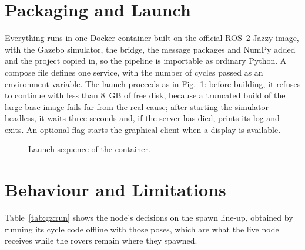 \section{Packaging and Launch}

Everything runs in one Docker container built on the official ROS~2 Jazzy
image, with the Gazebo simulator, the bridge, the message packages and NumPy
added and the project copied in, so the pipeline is importable as ordinary
Python. A compose file defines one service, with the number of cycles passed as
an environment variable. The launch proceeds as in Fig.~\ref{fig:gz:launch}:
before building, it refuses to continue with less than 8~GB of free disk,
because a truncated build of the large base image fails far from the real
cause; after starting the simulator headless, it waits three seconds and, if
the server has died, prints its log and exits. An optional flag starts the
graphical client when a display is available.

\begin{figure}[htbp]
\centering
{}
\caption{Launch sequence of the container.}
\label{fig:gz:launch}
\end{figure}

\section{Behaviour and Limitations}

Table~\ref{tab:gz:run} shows the node's decisions on the spawn line-up,
obtained by running its cycle code offline with those poses, which are what the
live node receives while the rovers remain where they spawned.

